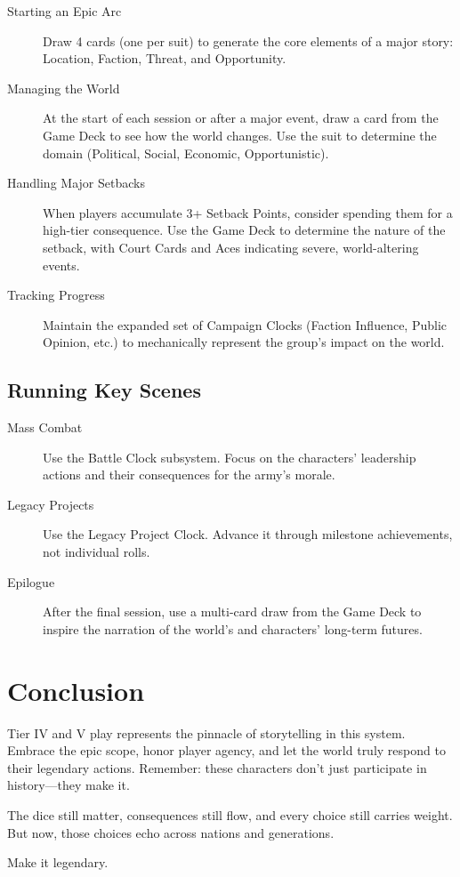 \begin{description}
    \item[Starting an Epic Arc] Draw 4 cards (one per suit) to generate the core elements of a major story: Location, Faction, Threat, and Opportunity.
    \item[Managing the World] At the start of each session or after a major event, draw a card from the Game Deck to see how the world changes. Use the suit to determine the domain (Political, Social, Economic, Opportunistic).
    \item[Handling Major Setbacks] When players accumulate 3+ Setback Points, consider spending them for a high-tier consequence. Use the Game Deck to determine the nature of the setback, with Court Cards and Aces indicating severe, world-altering events.
    \item[Tracking Progress] Maintain the expanded set of Campaign Clocks (Faction Influence, Public Opinion, etc.) to mechanically represent the group's impact on the world.
\end{description}

\subsection*{Running Key Scenes}

\begin{description}
    \item[Mass Combat] Use the Battle Clock subsystem. Focus on the characters' leadership actions and their consequences for the army's morale.
    \item[Legacy Projects] Use the Legacy Project Clock. Advance it through milestone achievements, not individual rolls.
    \item[Epilogue] After the final session, use a multi-card draw from the Game Deck to inspire the narration of the world's and characters' long-term futures.
\end{description}

\section{Conclusion}

Tier IV and V play represents the pinnacle of storytelling in this system. Embrace the epic scope, honor player agency, and let the world truly respond to their legendary actions. Remember: these characters don't just participate in history---they make it.

The dice still matter, consequences still flow, and every choice still carries weight. But now, those choices echo across nations and generations.

Make it legendary.
